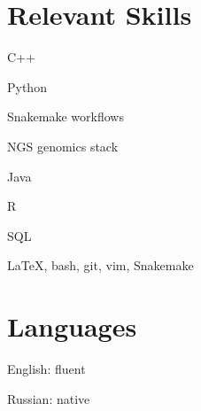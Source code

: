\section{Relevant Skills}
\vspace*{-.4cm}
\begin{innerlist}
  \item C++
  \item Python
  \item Snakemake workflows
  \item NGS genomics stack
  \item Java
  \item R
  \item SQL %
  \item \LaTeX, bash, git, vim, Snakemake
\end{innerlist}

\section{Languages}
\vspace*{-.4cm}
\begin{innerlist}
  \item English: fluent
  \item Russian: native
\end{innerlist}
